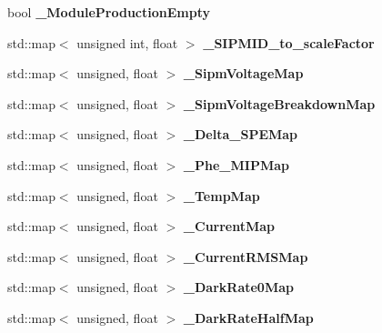 \begin{DoxyCompactItemize}
\item 
bool {\bfseries \-\_\-\-Module\-Production\-Empty}\label{classCALICE_1_1SiPmPropertiesProcessor_a24b9c0152d25707562bca6f25335cbfe}

\item 
std\-::map$<$ unsigned int, float $>$ {\bfseries \-\_\-\-S\-I\-P\-M\-I\-D\-\_\-to\-\_\-scale\-Factor}\label{classCALICE_1_1SiPmPropertiesProcessor_ab54d5d21a513778cf3e3f4553f5be538}

\item 
std\-::map$<$ unsigned, float $>$ {\bfseries \-\_\-\-Sipm\-Voltage\-Map}\label{classCALICE_1_1SiPmPropertiesProcessor_a63365171f3bf33d2134b1897875cba83}

\item 
std\-::map$<$ unsigned, float $>$ {\bfseries \-\_\-\-Sipm\-Voltage\-Breakdown\-Map}\label{classCALICE_1_1SiPmPropertiesProcessor_abebd280f89c688a481b501a4510c435b}

\item 
std\-::map$<$ unsigned, float $>$ {\bfseries \-\_\-\-Delta\-\_\-\-S\-P\-E\-Map}\label{classCALICE_1_1SiPmPropertiesProcessor_a2b53b09013432289bbf15a422b10b599}

\item 
std\-::map$<$ unsigned, float $>$ {\bfseries \-\_\-\-Phe\-\_\-\-M\-I\-P\-Map}\label{classCALICE_1_1SiPmPropertiesProcessor_a587b49d56165a88a3938f7fd26b82110}

\item 
std\-::map$<$ unsigned, float $>$ {\bfseries \-\_\-\-Temp\-Map}\label{classCALICE_1_1SiPmPropertiesProcessor_af04cc739127d761f2b1ae305b574cdb3}

\item 
std\-::map$<$ unsigned, float $>$ {\bfseries \-\_\-\-Current\-Map}\label{classCALICE_1_1SiPmPropertiesProcessor_a3481e547f6872a3b8c61f81f79dd2a57}

\item 
std\-::map$<$ unsigned, float $>$ {\bfseries \-\_\-\-Current\-R\-M\-S\-Map}\label{classCALICE_1_1SiPmPropertiesProcessor_a6650a16201f45447c8f0e1187747ab6a}

\item 
std\-::map$<$ unsigned, float $>$ {\bfseries \-\_\-\-Dark\-Rate0\-Map}\label{classCALICE_1_1SiPmPropertiesProcessor_a6cb7ed611c785639effe2b6d776fde93}

\item 
std\-::map$<$ unsigned, float $>$ {\bfseries \-\_\-\-Dark\-Rate\-Half\-Map}\label{classCALICE_1_1SiPmPropertiesProcessor_ad8580b0ff0a779571753ae4e7312bad5}


\end{DoxyCompactItemize}
